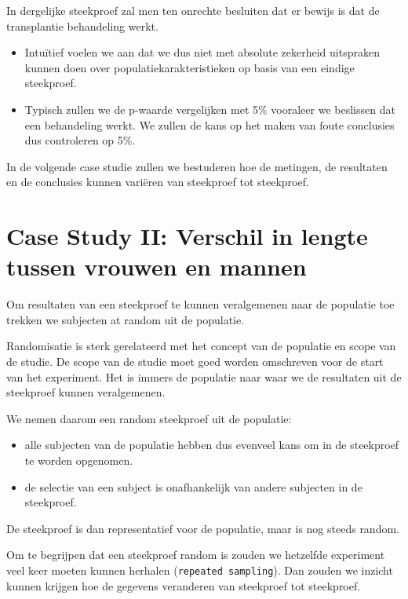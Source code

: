 \documentclass[
  12pt,dutch,coursenotes]{book}
\theoremstyle{definition}
\theoremstyle{definition}
\theoremstyle{definition}
\theoremstyle{remark}
\begin{document}
In dergelijke steekproef zal men ten onrechte besluiten dat er bewijs is dat de transplantie behandeling werkt.

\begin{itemize}
\item
  Intuïtief voelen we aan dat we dus niet met absolute zekerheid uitspraken kunnen doen over populatiekarakteristieken op basis van een eindige steekproef.
\item
  Typisch zullen we de p-waarde vergelijken met 5\% vooraleer we beslissen dat een behandeling werkt. We zullen de kans op het maken van foute conclusies dus controleren op 5\%.
\end{itemize}

In de volgende case studie zullen we bestuderen hoe de metingen, de resultaten en de conclusies kunnen variëren van steekproef tot steekproef.

\hypertarget{case-study-ii-verschil-in-lengte-tussen-vrouwen-en-mannen}{%
\section{Case Study II: Verschil in lengte tussen vrouwen en mannen}\label{case-study-ii-verschil-in-lengte-tussen-vrouwen-en-mannen}}

Om resultaten van een steekproef te kunnen veralgemenen naar de populatie toe trekken we subjecten at random uit de populatie.

Randomisatie is sterk gerelateerd met het concept van de populatie en scope van de studie.
De scope van de studie moet goed worden omschreven voor de start van het experiment. Het is immers de populatie naar waar we de resultaten uit de steekproef kunnen veralgemenen.

We nemen daarom een random steekproef uit de populatie:

\begin{itemize}
\item
  alle subjecten van de populatie hebben dus evenveel kans om in de steekproef te worden opgenomen.
\item
  de selectie van een subject is onafhankelijk van andere subjecten in de steekproef.
\end{itemize}

De steekproef is dan representatief voor de populatie, maar is nog steeds random.

Om te begrijpen dat een steekproef random is zouden we hetzelfde experiment veel keer moeten kunnen herhalen (\texttt{repeated\ sampling}). Dan zouden we inzicht kunnen krijgen hoe de gegevens veranderen van steekproef tot steekproef.
\end{document}
